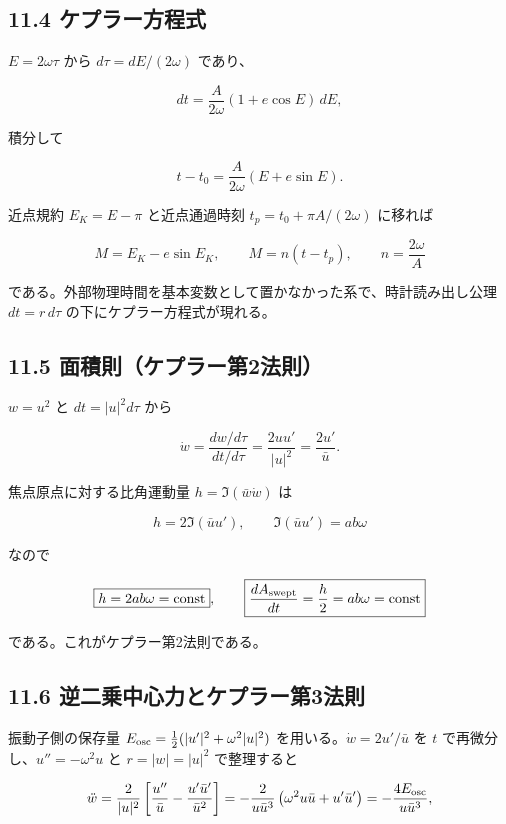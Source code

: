 \documentclass[
  a4paper,
]{ltjsarticle}
\begin{document}
\subsection{11.4
ケプラー方程式}\label{ux30b1ux30d7ux30e9ux30fcux65b9ux7a0bux5f0f}

\(E=2\omega\tau\) から \(d\tau=dE/(2\omega)\) であり、

\[
dt=\frac{A}{2\omega}(1+e\cos E)\,dE,
\]

積分して

\[
t-t_0=\frac{A}{2\omega}(E+e\sin E).
\]

近点規約 \(E_K=E-\pi\) と近点通過時刻 \(t_p=t_0+\pi A/(2\omega)\)
に移れば

\[
\boxed{M=E_K-e\sin E_K},
\qquad
M=n(t-t_p),
\qquad
\boxed{n=\frac{2\omega}A}
\]

である。外部物理時間を基本変数として置かなかった系で、時計読み出し公理
\(dt=r\,d\tau\) の下にケプラー方程式が現れる。

\subsection{11.5
面積則（ケプラー第2法則）}\label{ux9762ux7a4dux5247ux30b1ux30d7ux30e9ux30fcux7b2c2ux6cd5ux5247}

\(w=u^2\) と \(dt=|u|^2d\tau\) から

\[
\dot w=\frac{dw/d\tau}{dt/d\tau}=\frac{2uu'}{|u|^2}=\frac{2u'}{\bar u}.
\]

焦点原点に対する比角運動量 \(h=\Im(\bar w\dot w)\) は

\[
h=2\Im(\bar uu'),
\qquad
\Im(\bar uu')=ab\omega
\]

なので

\[
\boxed{h=2ab\omega=\mathrm{const}},
\qquad
\boxed{\frac{dA_{\rm swept}}{dt}=\frac h2=ab\omega=\mathrm{const}}
\]

である。これがケプラー第2法則である。

\subsection{11.6
逆二乗中心力とケプラー第3法則}\label{ux9006ux4e8cux4e57ux4e2dux5fc3ux529bux3068ux30b1ux30d7ux30e9ux30fcux7b2c3ux6cd5ux5247}

振動子側の保存量 \(E_{\rm osc}=\frac12(|u'|^2+\omega^2|u|^2)\)
を用いる。\(\dot w=2u'/\bar u\) を \(t\) で再微分し、\(u''=-\omega^2u\)
と \(r=|w|=|u|^2\) で整理すると

\[
\ddot w
=\frac{2}{|u|^2}\left[\frac{u''}{\bar u}-\frac{u'\bar u'}{\bar u^2}\right]
=-\frac{2}{u\bar u^3}\left(\omega^2u\bar u+u'\bar u'\right)
=-\frac{4E_{\rm osc}}{u\bar u^3},
\]
\end{document}
